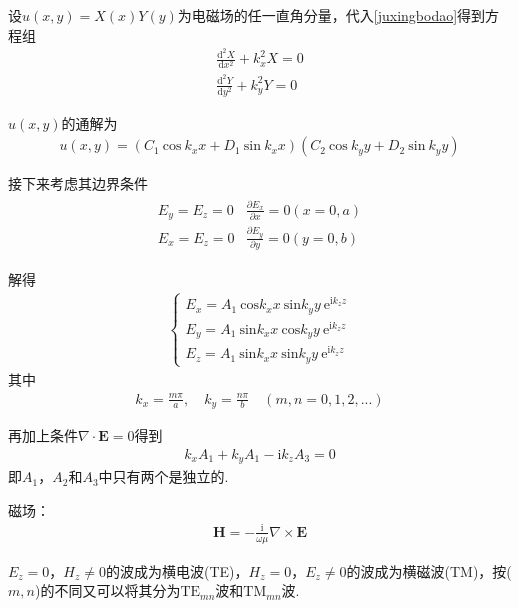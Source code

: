 \documentclass[main.tex]{subfiles}
\begin{document}
设$u(x,y) = X(x)Y(y)$为电磁场的任一直角分量，代入\ref{juxingbodao}得到方程组
\begin{align}
    \displaystyle \frac{\mathrm{d}^2 X}{\mathrm{d}x^2} + k_x^2 X = 0\\
    \displaystyle \frac{\mathrm{d}^2 Y}{\mathrm{d}y^2} + k_y^2 Y = 0
\end{align}

$u(x,y)$的通解为
\begin{align}
    u(x,y) = (C_1\  \mathrm{cos}\ k_xx+D_1\ \mathrm{sin}\ k_xx)(C_2\  \mathrm{cos}\ k_yy+D_2\ \mathrm{sin}\ k_yy)
\end{align}

接下来考虑其边界条件
\begin{align}
    \begin{array}{cc}
    E_y = E_z = 0 & \displaystyle \frac{\partial E_x}{\partial x} = 0(x = 0,a)\\
    E_x = E_z = 0 & \displaystyle \frac{\partial E_y}{\partial y} = 0(y = 0,b)
    \end{array}
\end{align}

解得
\begin{align}
    \left\{\begin{array}{l}
    E_x = A_1\ \mathrm{cos} k_xx\ \mathrm{sin}k_yy\ \mathrm{e}^{\mathrm{i} k_z z}\\
    E_y = A_1\ \mathrm{sin} k_xx\ \mathrm{cos}k_yy\ \mathrm{e}^{\mathrm{i} k_z z}\\
    E_z = A_1\ \mathrm{sin} k_xx\ \mathrm{sin}k_yy\ \mathrm{e}^{\mathrm{i} k_z z}
    \end{array}\right.
\end{align}
其中
\begin{align}
    k_x = \frac{m\pi}{a},\quad k_y = \frac{n\pi}{b}\quad (m,n = 0,1,2,...)
\end{align}

再加上条件$\nabla \cdot \boldsymbol{E} = 0$得到
\begin{align}
    k_xA_1 + k_yA_1 - \mathrm{i}k_zA_3 = 0
\end{align}
即$A_1$，$A_2$和$A_3$中只有两个是独立的.

磁场：
\begin{align}
    \boldsymbol{H} = -\frac{\mathrm{i}}{\omega \mu}\nabla \times \boldsymbol{E}
\end{align}

$E_z = 0$，$H_z \ne 0$的波成为横电波(TE)，$H_z = 0$，$E_z \ne 0$的波成为横磁波(TM)，按($m,n$)的不同又可以将其分为$\mathrm{TE}_{mn}$波和$\mathrm{TM}_{mn}$波.
\end{document}
